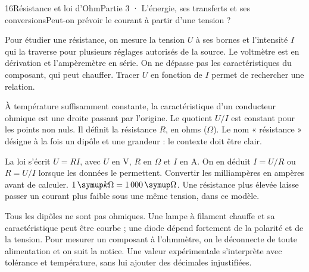 \begin{ouverture}[college3]{16}{Résistance et loi d’Ohm}{Partie 3 · L’énergie, ses transferts et ses conversions}{Peut-on prévoir le courant à partir d’une tension ?}
\end{ouverture}
\label{ess-16}
Pour étudier une résistance, on mesure la tension $U$ à ses bornes et l’intensité $I$ qui la traverse pour plusieurs réglages autorisés de la source. Le voltmètre est en dérivation et l’ampèremètre en série. On ne dépasse pas les caractéristiques du composant, qui peut chauffer. Tracer $U$ en fonction de $I$ permet de rechercher une relation.\par
{}
À température suffisamment constante, la caractéristique d’un conducteur ohmique est une droite passant par l’origine. Le quotient $U/I$ est constant pour les points non nuls. Il définit la résistance $R$, en ohms ($\Omega$). Le nom « résistance » désigne à la fois un dipôle et une grandeur : le contexte doit être clair.\par
\clearpage
{}
La loi s’écrit $U=RI$, avec $U$ en V, $R$ en $\Omega$ et $I$ en A. On en déduit $I=U/R$ ou $R=U/I$ lorsque les données le permettent. Convertir les milliampères en ampères avant de calculer. $1\unite{k\Omega}=1\,000\unite\Omega$. Une résistance plus élevée laisse passer un courant plus faible sous une même tension, dans ce modèle.\par
{}
Tous les dipôles ne sont pas ohmiques. Une lampe à filament chauffe et sa caractéristique peut être courbe ; une diode dépend fortement de la polarité et de la tension. Pour mesurer un composant à l’ohmmètre, on le déconnecte de toute alimentation et on suit la notice. Une valeur expérimentale s’interprète avec tolérance et température, sans lui ajouter des décimales injustifiées.\par
